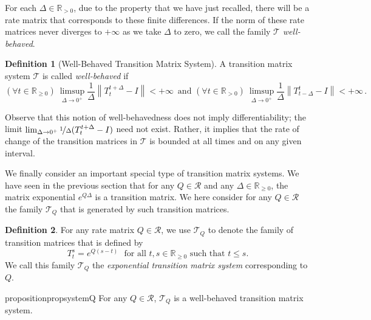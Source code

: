 \documentclass[10pt,a4paper]{paper}
\theoremstyle{definition}
\newtheorem{definition}{Definition}
\newcommand{\reals}{\mathbb{R}}
\newcommand{\realspos}{\reals_{>0}}
\newcommand{\realsnonneg}{\reals_{\geq 0}}
\newcommand{\norm}[1]{\left\lVert #1 \right\rVert}
\begin{document}
For each $\Delta\in\realspos$, due to the property that we have just recalled, there will be a rate matrix that corresponds to these finite differences. If the norm of these rate matrices never diverges to $+\infty$ as we take $\Delta$ to zero, we call the family $\mathcal{T}$ \emph{well-behaved}.

\begin{definition}[Well-Behaved Transition Matrix System]\label{def:well_behaved_trans_mat_system}
A transition matrix system $\mathcal{T}$ is called \emph{well-behaved} if 
\begin{equation}\label{eq:wellbehavedtransitionmatrixsystem}%
(\forall t\in\realsnonneg)~\limsup_{\Delta\to 0^{+}}\frac{1}{\Delta}\norm{T_{t}^{t+\Delta}-I}<+\infty\,
\text{~and~}
(\forall t\in\realspos)~\limsup_{\Delta\to 0^{+}}\frac{1}{\Delta}\norm{T_{t-\Delta}^t-I}<+\infty\,.
\end{equation}
\end{definition}

Observe that this notion of well-behavedness does not imply differentiability; the limit $\lim_{\Delta\to0^+}\nicefrac{1}{\Delta}(T_t^{t+\Delta}-I)$ need not exist. Rather, it implies that the rate of change of the transition matrices in $\mathcal{T}$ is bounded at all times and on any given interval.

We finally consider an important special type of transition matrix systems. We have seen in the previous section that for any $Q\in\mathcal{R}$ and any $\Delta\in\realsnonneg$, the matrix exponential $e^{Q\Delta}$ is a transition matrix. We here consider for any $Q\in\mathcal{R}$ the family $\mathcal{T}_Q$ that is generated by such transition matrices.
\begin{definition}\label{def:systemfromQ}For any rate matrix $Q\in\mathcal{R}$, we use $\mathcal{T}_Q$ to denote the family of transition matrices that is defined by
\begin{equation*}
T_t^s=e^{Q(s-t)}
\text{~~for all $t,s\in\realsnonneg$ such that $t\leq s$.}
\end{equation*}
We call this family $\mathcal{T}_Q$ the \emph{exponential transition matrix system} corresponding to $Q$.
\end{definition}

\begin{restatable}{proposition}{propsystemQ}
\label{prop:systemQ}
For any $Q\in\mathcal{R}$, $\mathcal{T}_Q$ is a well-behaved transition matrix system.
\end{restatable}
\end{document}
